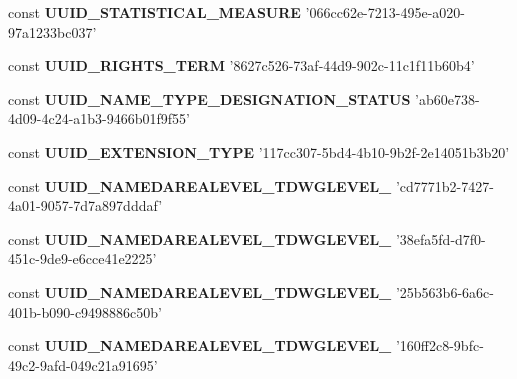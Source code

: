 \begin{DoxyCompactItemize}
\item 
\hypertarget{uuids_8php_afd1eb01c7b23c6ea9b0d5454bb212f17}{const {\bfseries U\-U\-I\-D\-\_\-\-S\-T\-A\-T\-I\-S\-T\-I\-C\-A\-L\-\_\-\-M\-E\-A\-S\-U\-R\-E} '066cc62e-\/7213-\/495e-\/a020-\/97a1233bc037'}\label{uuids_8php_afd1eb01c7b23c6ea9b0d5454bb212f17}

\item 
\hypertarget{uuids_8php_ae1b4ab0315b281c5f3783691fdcfb664}{const {\bfseries U\-U\-I\-D\-\_\-\-R\-I\-G\-H\-T\-S\-\_\-\-T\-E\-R\-M} '8627c526-\/73af-\/44d9-\/902c-\/11c1f11b60b4'}\label{uuids_8php_ae1b4ab0315b281c5f3783691fdcfb664}

\item 
\hypertarget{uuids_8php_ac7816e1c10c9684525f932eacd6ef341}{const {\bfseries U\-U\-I\-D\-\_\-\-N\-A\-M\-E\-\_\-\-T\-Y\-P\-E\-\_\-\-D\-E\-S\-I\-G\-N\-A\-T\-I\-O\-N\-\_\-\-S\-T\-A\-T\-U\-S} 'ab60e738-\/4d09-\/4c24-\/a1b3-\/9466b01f9f55'}\label{uuids_8php_ac7816e1c10c9684525f932eacd6ef341}

\item 
\hypertarget{uuids_8php_a32da97137ef25a9f76722bec8718f58a}{const {\bfseries U\-U\-I\-D\-\_\-\-E\-X\-T\-E\-N\-S\-I\-O\-N\-\_\-\-T\-Y\-P\-E} '117cc307-\/5bd4-\/4b10-\/9b2f-\/2e14051b3b20'}\label{uuids_8php_a32da97137ef25a9f76722bec8718f58a}

\item 
\hypertarget{uuids_8php_a72debb921d2744f0e2e30bf2dd3611d3}{const {\bfseries U\-U\-I\-D\-\_\-\-N\-A\-M\-E\-D\-A\-R\-E\-A\-L\-E\-V\-E\-L\-\_\-\-T\-D\-W\-G\-L\-E\-V\-E\-L\-\_} 'cd7771b2-\/7427-\/4a01-\/9057-\/7d7a897dddaf'}\label{uuids_8php_a72debb921d2744f0e2e30bf2dd3611d3}

\item 
\hypertarget{uuids_8php_ab83e3bbb5903e61dd1621fc8df9fc22a}{const {\bfseries U\-U\-I\-D\-\_\-\-N\-A\-M\-E\-D\-A\-R\-E\-A\-L\-E\-V\-E\-L\-\_\-\-T\-D\-W\-G\-L\-E\-V\-E\-L\-\_} '38efa5fd-\/d7f0-\/451c-\/9de9-\/e6cce41e2225'}\label{uuids_8php_ab83e3bbb5903e61dd1621fc8df9fc22a}

\item 
\hypertarget{uuids_8php_ade9acc4b5d7817a11bb586fbbc49e5ae}{const {\bfseries U\-U\-I\-D\-\_\-\-N\-A\-M\-E\-D\-A\-R\-E\-A\-L\-E\-V\-E\-L\-\_\-\-T\-D\-W\-G\-L\-E\-V\-E\-L\-\_} '25b563b6-\/6a6c-\/401b-\/b090-\/c9498886c50b'}\label{uuids_8php_ade9acc4b5d7817a11bb586fbbc49e5ae}

\item 
\hypertarget{uuids_8php_a6429bf99b68ce0392afff1eb58197e81}{const {\bfseries U\-U\-I\-D\-\_\-\-N\-A\-M\-E\-D\-A\-R\-E\-A\-L\-E\-V\-E\-L\-\_\-\-T\-D\-W\-G\-L\-E\-V\-E\-L\-\_} '160ff2c8-\/9bfc-\/49c2-\/9afd-\/049c21a91695'}\label{uuids_8php_a6429bf99b68ce0392afff1eb58197e81}


\end{DoxyCompactItemize}
